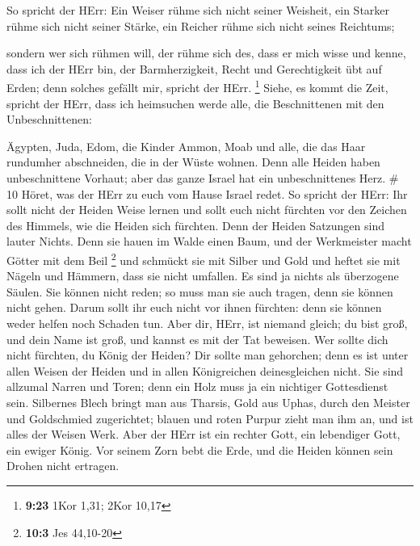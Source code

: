  So spricht der HErr: Ein Weiser rühme sich nicht seiner
Weisheit, ein Starker rühme sich nicht seiner Stärke, ein Reicher rühme
sich nicht seines Reichtums;

 sondern wer sich rühmen will, der rühme sich des, dass er
mich wisse und kenne, dass ich der HErr bin, der Barmherzigkeit, Recht
und Gerechtigkeit übt auf Erden; denn solches gefällt mir, spricht der
HErr. \footnote{\textbf{9:23} 1Kor 1,31; 2Kor 10,17} 
Siehe, es kommt die Zeit, spricht der HErr, dass ich heimsuchen werde
alle, die Beschnittenen mit den Unbeschnittenen:

 Ägypten, Juda, Edom, die Kinder Ammon, Moab und alle, die
das Haar rundumher abschneiden, die in der Wüste wohnen. Denn alle
Heiden haben unbeschnittene Vorhaut; aber das ganze Israel hat ein
unbeschnittenes Herz. \# 10  Höret, was der HErr zu euch vom
Hause Israel redet.  So spricht der HErr: Ihr sollt nicht
der Heiden Weise lernen und sollt euch nicht fürchten vor den Zeichen
des Himmels, wie die Heiden sich fürchten.  Denn der Heiden
Satzungen sind lauter Nichts. Denn sie hauen im Walde einen Baum, und
der Werkmeister macht Götter mit dem Beil \footnote{\textbf{10:3} Jes
  44,10-20}  und schmückt sie mit Silber und Gold und heftet
sie mit Nägeln und Hämmern, dass sie nicht umfallen.  Es
sind ja nichts als überzogene Säulen. Sie können nicht reden; so muss
man sie auch tragen, denn sie können nicht gehen. Darum sollt ihr euch
nicht vor ihnen fürchten: denn sie können weder helfen noch Schaden tun.
 Aber dir, HErr, ist niemand gleich; du bist groß, und dein
Name ist groß, und kannst es mit der Tat beweisen.  Wer
sollte dich nicht fürchten, du König der Heiden? Dir sollte man
gehorchen; denn es ist unter allen Weisen der Heiden und in allen
Königreichen deinesgleichen nicht.  Sie sind allzumal Narren
und Toren; denn ein Holz muss ja ein nichtiger Gottesdienst sein.
 Silbernes Blech bringt man aus Tharsis, Gold aus Uphas,
durch den Meister und Goldschmied zugerichtet; blauen und roten Purpur
zieht man ihm an, und ist alles der Weisen Werk.  Aber der
HErr ist ein rechter Gott, ein lebendiger Gott, ein ewiger König. Vor
seinem Zorn bebt die Erde, und die Heiden können sein Drohen nicht
ertragen.


